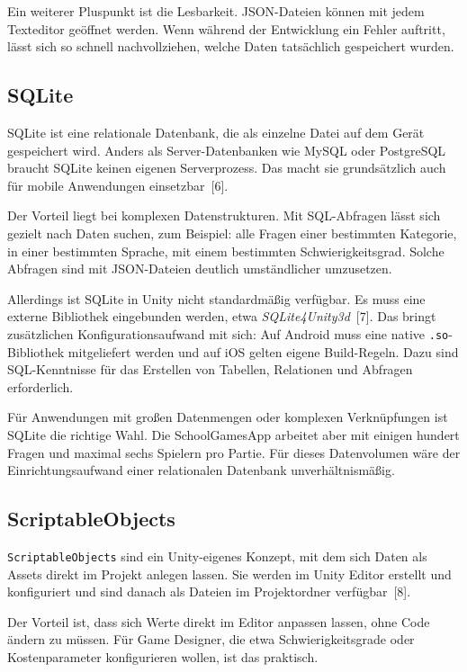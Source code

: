 \documentclass[12pt,a4paper]{article}
\begin{document}
Ein weiterer Pluspunkt ist die Lesbarkeit. JSON-Dateien können mit jedem Texteditor geöffnet werden. Wenn während der Entwicklung ein Fehler auftritt, lässt sich so schnell nachvollziehen, welche Daten tatsächlich gespeichert wurden.

\subsection{SQLite}

SQLite ist eine relationale Datenbank, die als einzelne Datei auf dem Gerät gespeichert wird. Anders als Server-Datenbanken wie MySQL oder PostgreSQL braucht SQLite keinen eigenen Serverprozess. Das macht sie grundsätzlich auch für mobile Anwendungen einsetzbar~[6].

Der Vorteil liegt bei komplexen Datenstrukturen. Mit SQL-Abfragen lässt sich gezielt nach Daten suchen, zum Beispiel: alle Fragen einer bestimmten Kategorie, in einer bestimmten Sprache, mit einem bestimmten Schwierigkeitsgrad. Solche Abfragen sind mit JSON-Dateien deutlich umständlicher umzusetzen.

Allerdings ist SQLite in Unity nicht standardmäßig verfügbar. Es muss eine externe Bibliothek eingebunden werden, etwa \textit{SQLite4Unity3d}~[7]. Das bringt zusätzlichen Konfigurationsaufwand mit sich: Auf Android muss eine native \texttt{.so}-Bibliothek mitgeliefert werden und auf iOS gelten eigene Build-Regeln. Dazu sind SQL-Kenntnisse für das Erstellen von Tabellen, Relationen und Abfragen erforderlich.

Für Anwendungen mit großen Datenmengen oder komplexen Verknüpfungen ist SQLite die richtige Wahl. Die SchoolGamesApp arbeitet aber mit einigen hundert Fragen und maximal sechs Spielern pro Partie. Für dieses Datenvolumen wäre der Einrichtungsaufwand einer relationalen Datenbank unverhältnismäßig.

\subsection{ScriptableObjects}

\texttt{ScriptableObjects} sind ein Unity-eigenes Konzept, mit dem sich Daten als Assets direkt im Projekt anlegen lassen. Sie werden im Unity Editor erstellt und konfiguriert und sind danach als Dateien im Projektordner verfügbar~[8].

Der Vorteil ist, dass sich Werte direkt im Editor anpassen lassen, ohne Code ändern zu müssen. Für Game Designer, die etwa Schwierigkeitsgrade oder Kostenparameter konfigurieren wollen, ist das praktisch.
\end{document}
